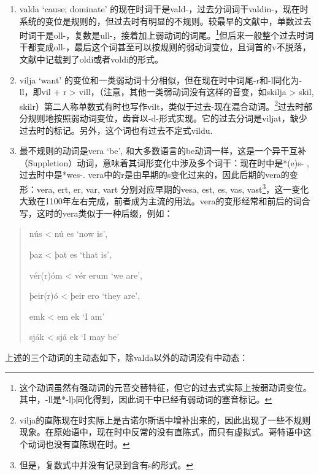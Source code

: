 \begin{enumerate}
\def\labelenumi{\arabic{enumi}.}
\item
  valda `cause; dominate‌'
  的现在时词干是vald-，过去分词词干valdin-，现在时系统的变位是规则的，但过去时有明显的不规则。较最早的文献中，单数过去时词干是oll-，复数是ull-，接着加上弱动词的词尾。\footnote{这个动词虽然有强动词的元音交替特征，但它的过去式实际上按弱动词变位。其中，-ll是*-lþ同化得到，因此词干中已经有弱动词的塞音标记。}但后来一般整个过去时词干都变成oll-，最后这个词甚至可以按规则的弱动词变位，且词首的v不脱落，文献中记载到了oldi或者voldi的形式。
\item
  vilja `want‌'
  的变位和一类弱动词十分相似，但在现在时中词尾-r和-l同化为-ll，即vil + r
  \textgreater{} vill，（注意，其他一类弱动词没有这样的音变，如skilja
  \textgreater{} skil,
  skilr）第二人称单数式有时也写作vilt，类似于过去-现在混合动词。\footnote{vilja的直陈现在时实际上是古诺尔斯语中增补出来的，因此出现了一些不规则现象。在原始语中，现在时中反常的没有直陈式，而只有虚拟式。哥特语中这个动词也没有直陈现在时。}过去时部分规则地按照弱动词变位，齿音以-d-形式实现。它的过去分词是viljat，缺少过去时的标记。另外，这个词也有过去不定式vildu.
\item
  最不规则的动词是vera `be‌',
  和大多数语言的be动词一样，这是一个异干互补（Suppletion）动词，意味着其词形变化中涉及多个词干：现在时中是*(e)s-
  , 过去时中是*wes-.
  vera中的r是由早期的s变化过来的，因此后期的vera的变形：vera, ert, er,
  var, vart 分别对应早期的vesa, est, es, vas,
  vast\footnote{但是，复数式中并没有记录到含有s的形式。}，这一变化大致在1100年左右完成，前者成为主流的用法。vera的变形经常和前后的词合写，这时的vera类似于一种后缀，例如：
\end{enumerate}

\begin{quote}
nús \textless{} nú es `now is‌',

þaz \textless{} þat es `that is‌',

vér(r)óm \textless{} vér erum `we are‌',

þeir(r)ó \textless{} þeir ero `they are‌',

emk \textless{} em ek `I am'

sják \textless{} sjá ek `I may be'
\end{quote}

上述的三个动词的主动态如下，除valda以外的动词没有中动态：


